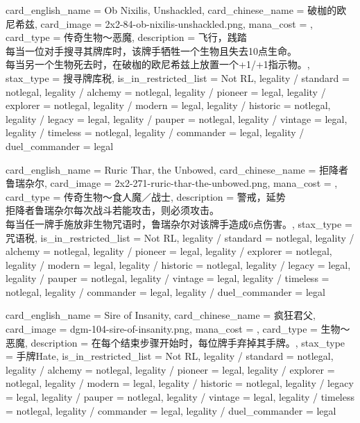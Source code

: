 \documentclass[lang = cn, color = black, 10pt]{AllThatStax}
\begin{document}
\card
{
	card_english_name = {Ob Nixilis, Unshackled},
	card_chinese_name = {破枷的欧尼希兹},
	card_image = 2x2-84-ob-nixilis-unshackled.png,
	mana_cost = ,
	card_type = 传奇生物～恶魔,
	description = {飞行，践踏\\
每当一位对手搜寻其牌库时，该牌手牺牲一个生物且失去10点生命。\\
每当另一个生物死去时，在破枷的欧尼希兹上放置一个+1/+1指示物。},
	stax_type = 搜寻牌库税,
	is_in_restricted_list = Not RL,
	legality / standard = notlegal,
	legality / alchemy = notlegal,
	legality / pioneer = legal,
	legality / explorer = notlegal,
	legality / modern = legal,
	legality / historic = notlegal,
	legality / legacy = legal,
	legality / pauper = notlegal,
	legality / vintage = legal,
	legality / timeless = notlegal,
	legality / commander = legal,
	legality / duel_commander = legal
}

\card
{
	card_english_name = {Ruric Thar, the Unbowed},
	card_chinese_name = {拒降者鲁瑞杂尔},
	card_image = 2x2-271-ruric-thar-the-unbowed.png,
	mana_cost = ,
	card_type = 传奇生物～食人魔／战士,
	description = {警戒，延势\\
拒降者鲁瑞杂尔每次战斗若能攻击，则必须攻击。\\
每当任一牌手施放非生物咒语时，鲁瑞杂尔对该牌手造成6点伤害。},
	stax_type = 咒语税,
	is_in_restricted_list = Not RL,
	legality / standard = notlegal,
	legality / alchemy = notlegal,
	legality / pioneer = legal,
	legality / explorer = notlegal,
	legality / modern = legal,
	legality / historic = notlegal,
	legality / legacy = legal,
	legality / pauper = notlegal,
	legality / vintage = legal,
	legality / timeless = notlegal,
	legality / commander = legal,
	legality / duel_commander = legal
}

\card
{
	card_english_name = {Sire of Insanity},
	card_chinese_name = {疯狂君父},
	card_image = dgm-104-sire-of-insanity.png,
	mana_cost = ,
	card_type = 生物～恶魔,
	description = {在每个结束步骤开始时，每位牌手弃掉其手牌。},
	stax_type = 手牌Hate,
	is_in_restricted_list = Not RL,
	legality / standard = notlegal,
	legality / alchemy = notlegal,
	legality / pioneer = legal,
	legality / explorer = notlegal,
	legality / modern = legal,
	legality / historic = notlegal,
	legality / legacy = legal,
	legality / pauper = notlegal,
	legality / vintage = legal,
	legality / timeless = notlegal,
	legality / commander = legal,
	legality / duel_commander = legal
}
\end{document}

